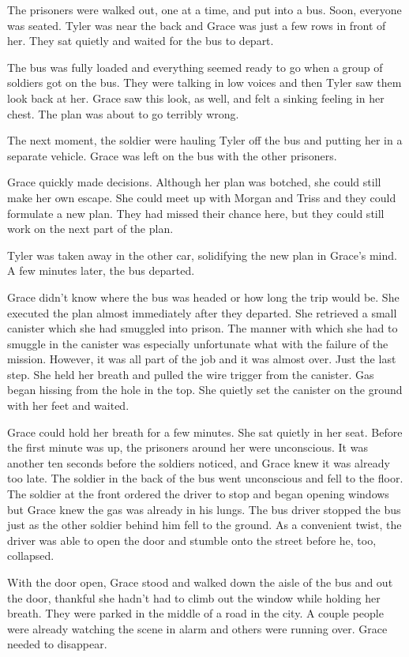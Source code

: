 \documentclass[courier]{sffms}
\begin{document}
The prisoners were walked out, one at a time, and put into a
bus. Soon, everyone was seated. Tyler was near the back and
Grace was just a few rows in front of her. They sat quietly and
waited for the bus to depart.

The bus was fully loaded and everything seemed ready to go
when a group of soldiers got on the bus. They were talking in
low voices and then Tyler saw them look back at her. Grace
saw this look, as well, and felt a sinking feeling in her chest.
The plan was about to go terribly wrong.

The next moment, the soldier were hauling Tyler off the bus and
putting her in a separate vehicle. Grace was left on the bus with
the other prisoners.

Grace quickly made decisions. Although her plan was botched,
she could still make her own escape. She could meet up with
Morgan and Triss and they could formulate a new plan. They
had missed their chance here, but they could still work on the
next part of the plan.

Tyler was taken away in the other car, solidifying the new plan
in Grace's mind. A few minutes later, the bus departed.

Grace didn't know where the bus was headed or how long the
trip would be. She executed the plan almost immediately after
they departed. She retrieved a small canister which she had
smuggled into prison. The manner with which she had to
smuggle in the canister was especially unfortunate what with
the failure of the mission. However, it was all part of the 
job and it was almost over. Just the last step. She held
her breath and pulled the
wire trigger from the canister. Gas began hissing from the
hole in the top. She quietly set the canister on the ground
with her feet and waited.

Grace could hold her breath for a few minutes.
She sat quietly in her seat. Before the first minute was up,
the prisoners around her were unconscious. It was another
ten seconds before the soldiers noticed, and Grace knew
it was already too late. The soldier in the back of the bus
went unconscious and fell to the floor. The soldier at the front
ordered the driver to stop and began opening windows
but Grace knew the gas was already in his lungs. The bus
driver stopped the bus just as the other soldier behind him fell
to the ground. As a convenient twist, the driver was able to
open the door and stumble onto the street before he, too,
collapsed.

With the door open, Grace stood and walked down the
aisle of the bus and out the door, thankful she hadn't had
to climb out the window while holding her breath. They
were parked in the middle of a road in the city. A couple
people were already watching the scene in alarm and others
were running over. Grace needed to disappear.
\end{document}
